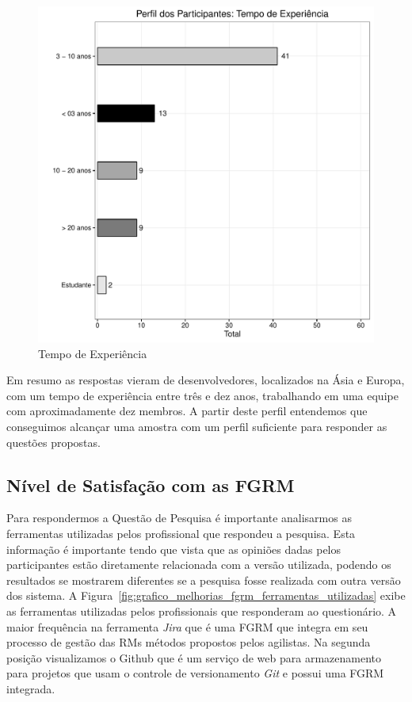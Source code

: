 \begin{figure}[htpb]
	\centering
	\includegraphics[width=0.8\linewidth]{./chapter-pesquisa-com-profissionais/img/grafico_melhorias_fgrm_tempo_experiencia.pdf}
	\caption{Tempo de Experiência}
\label{fig:grafico_melhorias_fgrm_tempo_experiencia}
\end{figure}

Em resumo as respostas vieram de desenvolvedores, localizados na Ásia e Europa,
com um tempo de experiência entre três e dez anos, trabalhando em uma equipe com
aproximadamente dez membros. A partir deste perfil entendemos que conseguimos
alcançar uma amostra com um perfil suficiente para responder as questões
propostas.

\subsection{Nível de Satisfação com as FGRM}
\label{sub:nivel_de_satisfação_com_as_fgrm}

Para respondermos a Questão de Pesquisa é importante analisarmos as ferramentas
utilizadas pelos profissional que respondeu a pesquisa. Esta informação é
importante tendo que vista que as opiniões dadas pelos participantes estão
diretamente relacionada com a versão utilizada, podendo os resultados se
mostrarem diferentes se a pesquisa fosse realizada com outra versão dos sistema.
A Figura~\ref{fig:grafico_melhorias_fgrm_ferramentas_utilizadas} exibe as
ferramentas utilizadas pelos profissionais que responderam ao questionário. A
maior frequência na ferramenta \textit{Jira} que é uma FGRM que integra em seu
processo de gestão das RMs métodos propostos pelos agilistas. Na segunda
posição visualizamos o Github que é um serviço de web para armazenamento para
projetos que usam o controle de versionamento \textit{Git} e possui uma FGRM
integrada.


